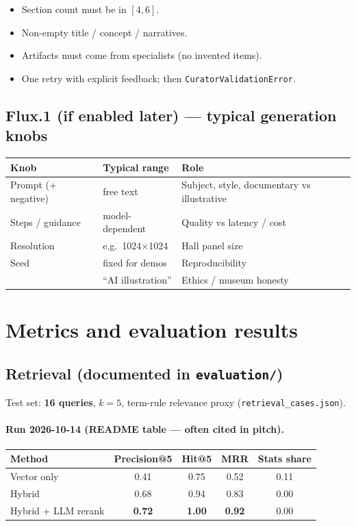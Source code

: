 \documentclass[11pt,a4paper]{article}
\begin{document}
\begin{itemize}[nosep]
  \item Section count must be in $[4,6]$.
  \item Non-empty title / concept / narratives.
  \item Artifacts must come from specialists (no invented items).
  \item One retry with explicit feedback; then \texttt{CuratorValidationError}.
\end{itemize}

\subsection{Flux.1 (if enabled later) --- typical generation knobs}

\begin{tabular}{@{}llp{7.2cm}@{}}
\toprule
\textbf{Knob} & \textbf{Typical range} & \textbf{Role} \\
\midrule
Prompt (+ negative) & free text & Subject, style, documentary vs illustrative \\
Steps / guidance & model-dependent & Quality vs latency / cost \\
Resolution & e.g.\ 1024$\times$1024 & Hall panel size \\
Seed & fixed for demos & Reproducibility \\
\label & ``AI illustration'' & Ethics / museum honesty \\
\bottomrule
\end{tabular}

\section{Metrics and evaluation results}

\subsection{Retrieval (documented in \texttt{evaluation/})}

Test set: \textbf{16 queries}, $k=5$, term-rule relevance proxy
(\texttt{retrieval\_cases.json}).

\paragraph{Run 2026-10-14 (README table --- often cited in pitch).}
\begin{center}
\begin{tabular}{@{}lcccc@{}}
\toprule
Method & Precision@5 & Hit@5 & MRR & Stats share \\
\midrule
Vector only & 0.41 & 0.75 & 0.52 & 0.11 \\
Hybrid & 0.68 & 0.94 & 0.83 & 0.00 \\
Hybrid + LLM rerank & \textbf{0.72} & \textbf{1.00} & \textbf{0.92} & 0.00 \\
\bottomrule
\end{tabular}
\end{center}
\end{document}
